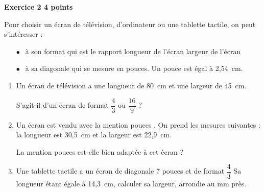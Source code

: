 \textbf{Exercice 2 \hfill 4 points}

\bigskip

Pour choisir un écran de télévision, d'ordinateur ou une tablette tactile, on peut s'intéresser : 
\setlength\parindent{5mm}
\begin{itemize}
\item[$\bullet~~$] à son format qui est le rapport longueur de l'écran largeur de l'écran 
\item[$\bullet~~$] à sa diagonale qui se mesure en pouces. Un pouce est égal à 2,54~cm.
\end{itemize}
\setlength\parindent{0mm}

\medskip
 
\begin{enumerate}
\item Un écran de télévision a une longueur de 80~cm et une largeur de 45~cm.
 
S'agit-il d'un écran de format $\dfrac{4}{3}$ ou $\dfrac{16}{9}$ ? 
\item Un écran est vendu avec la mention  pouces \fg. On prend les mesures suivantes : la longueur est 30,5~cm et la largeur est 22,9~cm. 

La mention  pouces \fg{} est-elle bien adaptée à cet écran ? 
\item Une tablette tactile a un écran de diagonale 7 pouces et de format $\dfrac{4}{3}$ 
Sa longueur étant égale à 14,3~cm, calculer sa largeur, arrondie au mm près.
\end{enumerate}
 
\bigskip
 
